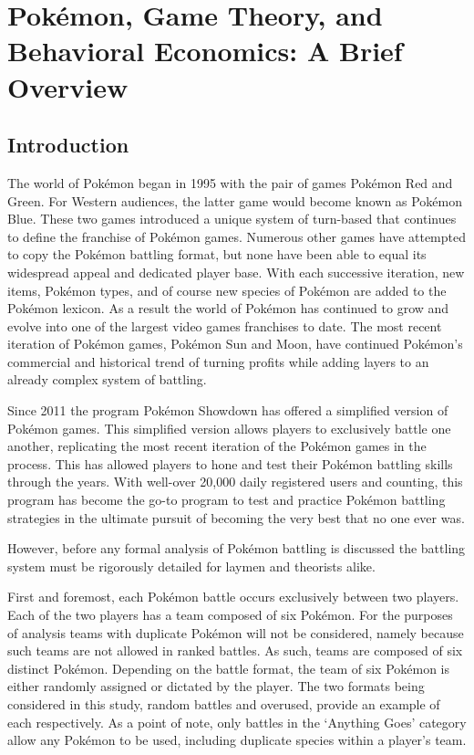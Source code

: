\documentclass[12pt,twoside]{reedthesis}
\begin{document}
  \mainmatter %
  \pagestyle{fancyplain} %

  \chapter{Pokémon, Game Theory, and Behavioral Economics: A Brief
  Overview}\label{pokemon-game-theory-and-behavioral-economics-a-brief-overview}
  
  \section{Introduction}\label{introduction}
  
  The world of Pokémon began in 1995 with the pair of games Pokémon Red
  and Green. For Western audiences, the latter game would become known as
  Pokémon Blue. These two games introduced a unique system of turn-based
  that continues to define the franchise of Pokémon games. Numerous other
  games have attempted to copy the Pokémon battling format, but none have
  been able to equal its widespread appeal and dedicated player base. With
  each successive iteration, new items, Pokémon types, and of course new
  species of Pokémon are added to the Pokémon lexicon. As a result the
  world of Pokémon has continued to grow and evolve into one of the
  largest video games franchises to date. The most recent iteration of
  Pokémon games, Pokémon Sun and Moon, have continued Pokémon's commercial
  and historical trend of turning profits while adding layers to an
  already complex system of battling.
  
  Since 2011 the program Pokémon Showdown has offered a simplified version
  of Pokémon games. This simplified version allows players to exclusively
  battle one another, replicating the most recent iteration of the Pokémon
  games in the process. This has allowed players to hone and test their
  Pokémon battling skills through the years. With well-over 20,000 daily
  registered users and counting, this program has become the go-to program
  to test and practice Pokémon battling strategies in the ultimate pursuit
  of becoming the very best that no one ever was.
  
  However, before any formal analysis of Pokémon battling is discussed the
  battling system must be rigorously detailed for laymen and theorists
  alike.
  
  First and foremost, each Pokémon battle occurs exclusively between two
  players. Each of the two players has a team composed of six Pokémon. For
  the purposes of analysis teams with duplicate Pokémon will not be
  considered, namely because such teams are not allowed in ranked battles.
  As such, teams are composed of six distinct Pokémon. Depending on the
  battle format, the team of six Pokémon is either randomly assigned or
  dictated by the player. The two formats being considered in this study,
  random battles and overused, provide an example of each respectively. As
  a point of note, only battles in the `Anything Goes' category allow any
  Pokémon to be used, including duplicate species within a player's team.
  
\end{document}
